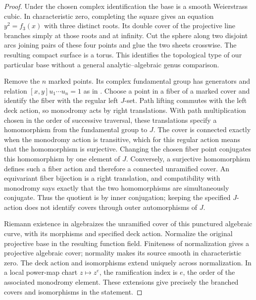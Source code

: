 \begin{proof}
Under the chosen complex identification the base is a smooth
Weierstrass cubic. In characteristic zero, completing the square gives
an equation $y^2=f_3(x)$ with three distinct roots. Its double cover of
the projective line branches simply at those roots and at infinity.
Cut the sphere along two disjoint arcs joining pairs of these four
points and glue the two sheets crosswise. The resulting compact surface
is a torus. This identifies the topological type of our particular
base without a general analytic--algebraic genus comparison.

Remove the $n$ marked points. Its complex fundamental group has
generators and relation
$[x,y]u_1\cdots u_n=1$ as in .
Choose a point in a fiber of a marked cover and identify the fiber with
the regular left $J$-set.  Path lifting commutes with the left deck
action, so monodromy acts by right translations.  With path multiplication
chosen in the order of successive traversal, these translations specify
a homomorphism from the fundamental group to $J$.  The cover is
connected exactly when the monodromy action is transitive, which for
this regular action means that the homomorphism is surjective.
Changing the chosen fiber point conjugates this homomorphism by one
element of $J$.  Conversely, a surjective homomorphism defines such a
fiber action and therefore a connected unramified cover.
An equivariant fiber bijection is a right translation, and compatibility
with monodromy says exactly that the two homomorphisms are simultaneously
conjugate.  Thus the quotient is by inner conjugation; keeping the
specified $J$-action does not identify covers through outer automorphisms
of $J$.

Riemann existence in  algebraizes the
unramified cover of this punctured algebraic curve, with its morphisms
and specified deck action. Normalize the original projective base in
the resulting function field. Finiteness of normalization gives a
projective algebraic cover; normality makes its source smooth in
characteristic zero. The deck action and isomorphisms extend uniquely
across normalization. In a local power-map chart $z\mapsto z^e$, the
ramification index is $e$, the order of the associated monodromy
element. These extensions give precisely the branched covers and
isomorphisms in the statement.


\end{proof}
